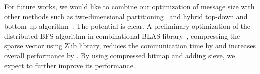 \documentclass[conference]{IEEEtran}
\begin{document}
For future works, we would like to combine our optimization of message size
with other methods such as two-dimensional partitioning~\cite{Buluc:2011} and
hybrid top-down and bottom-up algorithm~\cite{Beamer:EECS-2011-117}. The
potential is clear. A preliminary optimization of the distributed BFS
algorithm in combinational BLAS library~\cite{combblas-buluc}, compressing the
sparse vector using Zlib library, reduces the communication time by 
and increases overall performance by . By using compressed bitmap
and adding sieve, we expect to further improve its performance.
\end{document}
